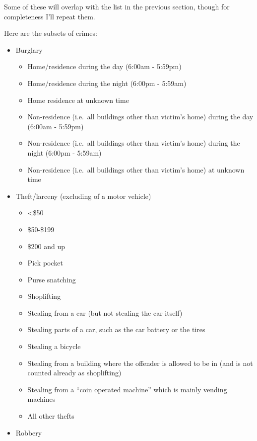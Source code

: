 \documentclass[
]{krantz}
\providecommand{\tightlist}{%
  \setlength{\itemsep}{0pt}\setlength{\parskip}{0pt}}
\begin{document}
Some of these will overlap with the list in the previous
section, though for completeness I'll repeat them.

Here are the subsets of crimes:

\begin{itemize}
\tightlist
\item
  Burglary

  \begin{itemize}
  \tightlist
  \item
    Home/residence during the day (6:00am - 5:59pm)
  \item
    Home/residence during the night (6:00pm - 5:59am)
  \item
    Home residence at unknown time
  \item
    Non-residence (i.e.~all buildings other than victim's
    home) during the day (6:00am - 5:59pm)
  \item
    Non-residence (i.e.~all buildings other than victim's
    home) during the night (6:00pm - 5:59am)
  \item
    Non-residence (i.e.~all buildings other than victim's
    home) at unknown time
  \end{itemize}
\item
  Theft/larceny (excluding of a motor vehicle)

  \begin{itemize}
  \tightlist
  \item
    \textless\$50
  \item
    \$50-\$199
  \item
    \$200 and up
  \item
    Pick pocket
  \item
    Purse snatching
  \item
    Shoplifting
  \item
    Stealing from a car (but not stealing the car itself)
  \item
    Stealing parts of a car, such as the car battery or the
    tires
  \item
    Stealing a bicycle
  \item
    Stealing from a building where the offender is allowed
    to be in (and is not counted already as shoplifting)
  \item
    Stealing from a ``coin operated machine'' which is
    mainly vending machines
  \item
    All other thefts
  \end{itemize}
\item
  Robbery


\end{itemize}
\end{document}
